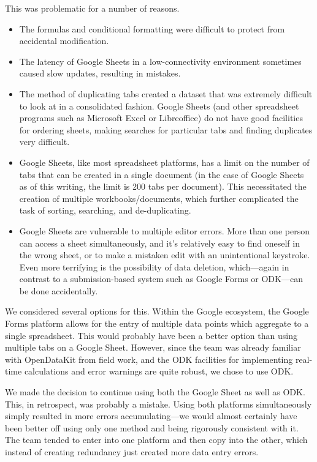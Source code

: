 \documentclass[a4paper,12pt]{article}
\begin{document}
This was problematic for a number of reasons.

\begin{itemize}
  \item The formulas and conditional formatting were difficult to protect from accidental modification.
  \item The latency of Google Sheets in a low-connectivity environment sometimes caused slow updates, resulting in mistakes.
  \item The method of duplicating tabs created a dataset that was extremely difficult to look at in a consolidated fashion. Google Sheets (and other spreadsheet programs such as Microsoft Excel or Libreoffice) do not have good facilities for ordering sheets, making searches for particular tabs and finding duplicates very difficult.
  \item Google Sheets, like most spreadsheet platforms, has a limit on the number of tabs that can be created in a single document (in the case of Google Sheets as of this writing, the limit is 200 tabs per document). This necessitated the creation of multiple workbooks/documents, which further complicated the task of sorting, searching, and de-duplicating.
  \item Google Sheets are vulnerable to multiple editor errors. More than one person can access a sheet simultaneously, and it's relatively easy to find oneself in the wrong sheet, or to make a mistaken edit with an unintentional keystroke. Even more terrifying is the possibility of data deletion, which---again in contrast to a submission-based system such as Google Forms or ODK---can be done accidentally. 
\end{itemize}

We considered several options for this. Within the Google ecosystem, the Google Forms platform allows for the entry of multiple data points which aggregate to a single spreadsheet. This would probably have been a better option than using multiple tabs on a Google Sheet. However, since the team was already familiar with OpenDataKit from field work, and the ODK facilities for implementing real-time calculations and error warnings are quite robust, we chose to use ODK.

We made the decision to continue using both the Google Sheet as well as ODK. This, in retrospect, was probably a mistake. Using both platforms simultaneously simply resulted in more errors accumulating---we would almost certainly have been better off using only one method and being rigorously consistent with it. The team tended to enter into one platform and then copy into the other, which instead of creating redundancy just created more data entry errors.
\end{document}
